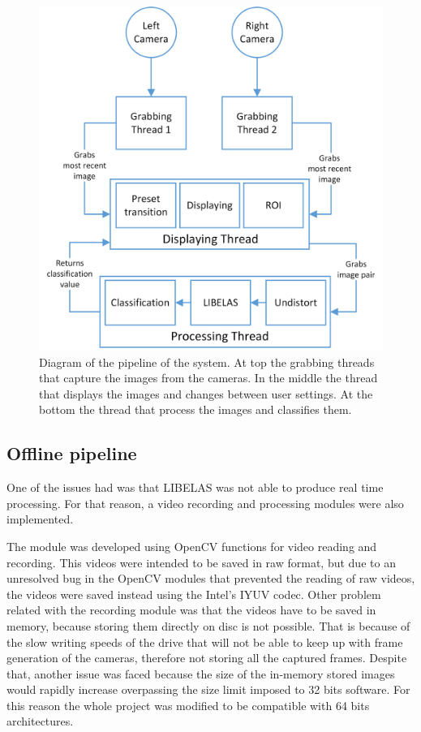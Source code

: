 \documentclass[10pt,a4paper,twocolumn,twoside]{article}
\begin{document}
	\begin{figure}
		\centering
		\includegraphics[width=1\linewidth]{img/pipeline.png}
		\caption{Diagram of the pipeline of the system. At top the grabbing threads that capture the images from the cameras. In the middle the thread that displays the images and changes between user settings. At the bottom the thread that process the images and classifies them.   }
		\label{fig:pipeline}
	\end{figure}
	
	
	\subsection{Offline pipeline}
	One of the issues had was that LIBELAS was not able to produce real time processing. For that reason, a video recording and processing modules were also implemented.  
	
	The module was developed using OpenCV functions for video reading and recording. This videos were intended to be saved in raw format, but due to an unresolved bug in the OpenCV modules that prevented the reading of raw videos, the videos were saved instead using the Intel's IYUV codec. %
	Other problem related with the recording module was that the videos have to be saved in memory, because storing them directly on disc is not possible. That is because of the slow writing speeds of the drive that will not be able to keep up with frame generation of the cameras, therefore not storing all the captured frames. Despite that, another issue was faced because the size of the in-memory stored images would rapidly increase overpassing the size limit imposed to 32 bits software. For this reason the whole project was modified to be compatible with 64 bits architectures.
	
\end{document}
